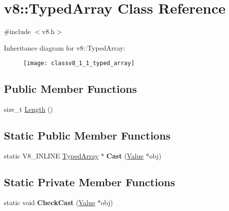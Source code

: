 \hypertarget{classv8_1_1_typed_array}{}\section{v8\+:\+:Typed\+Array Class Reference}
\label{classv8_1_1_typed_array}


{\ttfamily \#include $<$v8.\+h$>$}

Inheritance diagram for v8\+:\+:Typed\+Array\+:\begin{figure}[H]
\begin{center}
\leavevmode
\texttt{[image: classv8\_1\_1\_typed\_array]}
\end{center}
\end{figure}
\subsection*{Public Member Functions}
\begin{DoxyCompactItemize}
\item 
size\+\_\+t \hyperlink{classv8_1_1_typed_array_abb1047225d53d960c0da9c9f83cd7042}{Length} ()
\end{DoxyCompactItemize}
\subsection*{Static Public Member Functions}
\begin{DoxyCompactItemize}
\item 
static V8\+\_\+\+I\+N\+L\+I\+NE \hyperlink{classv8_1_1_typed_array}{Typed\+Array} $\ast$ {\bfseries Cast} (\hyperlink{classv8_1_1_value}{Value} $\ast$obj)\hypertarget{classv8_1_1_typed_array_ac3f23cc8171d3be0815df7731140382f}{}\label{classv8_1_1_typed_array_ac3f23cc8171d3be0815df7731140382f}

\end{DoxyCompactItemize}
\subsection*{Static Private Member Functions}
\begin{DoxyCompactItemize}
\item 
static void {\bfseries Check\+Cast} (\hyperlink{classv8_1_1_value}{Value} $\ast$obj)\hypertarget{classv8_1_1_typed_array_a6090fa2a65716b1eb1b200ce167d9568}{}\label{classv8_1_1_typed_array_a6090fa2a65716b1eb1b200ce167d9568}

\end{DoxyCompactItemize}
